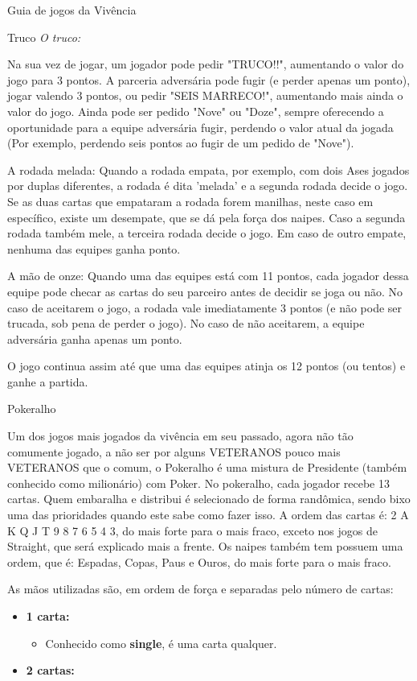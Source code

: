 \begin{secao}{Guia de jogos da Vivência }
\begin{subsecao}{Truco}
\textit{O truco:}

Na sua vez de jogar, um jogador pode pedir "TRUCO!!", aumentando o valor do jogo para 3 pontos. A parceria adversária pode fugir (e perder apenas um ponto), jogar valendo 3 pontos, ou pedir "SEIS MARRECO!", aumentando mais ainda o valor do jogo. Ainda pode ser pedido "Nove" ou "Doze", sempre oferecendo a oportunidade para a equipe adversária fugir, perdendo o valor atual da jogada (Por exemplo, perdendo seis pontos ao fugir de um pedido de "Nove"). 

A rodada melada: Quando a rodada empata, por exemplo, com dois Ases jogados por duplas diferentes, a rodada é dita 'melada' e a segunda rodada decide o jogo. Se as duas cartas que empataram a rodada forem manilhas, neste caso em específico, existe um desempate, que se dá pela força dos naipes.  Caso a segunda rodada também mele, a terceira rodada decide o jogo. Em caso de outro empate, nenhuma das equipes ganha ponto. 

A mão de onze: Quando uma das equipes está com 11 pontos, cada jogador dessa equipe pode checar as cartas do seu parceiro antes de decidir se joga ou não. No caso de aceitarem o jogo, a rodada vale imediatamente 3 pontos (e não pode ser trucada, sob pena de perder o jogo). No caso de não aceitarem, a equipe adversária ganha apenas um ponto. 

O jogo continua assim até que uma das equipes atinja os 12 pontos (ou tentos) e ganhe a partida. 

\end{subsecao}
\begin{subsecao}{Pokeralho}

Um dos jogos mais jogados da vivência em seu passado, agora não tão comumente jogado, a não ser por alguns VETERANOS pouco mais VETERANOS que o comum, o Pokeralho é uma mistura de Presidente (também conhecido como milionário) com Poker. 
No pokeralho, cada jogador recebe 13 cartas. Quem embaralha e distribui é selecionado de forma randômica, sendo bixo uma das prioridades quando este sabe como fazer isso. 
A ordem das cartas é: 2 A K Q J T 9 8 7 6 5 4 3, do mais forte para o mais fraco, exceto nos jogos de Straight, que será explicado mais a frente. 
Os naipes também tem possuem uma ordem, que é: Espadas, Copas, Paus e Ouros, do mais forte para o mais fraco. 

As mãos utilizadas são, em ordem de força e separadas pelo número de cartas:
\begin{itemize}


\item \textbf {1 carta:}
\begin{itemize}
\item Conhecido como \textbf{single}, é uma carta qualquer.
\end{itemize}
\item \textbf {2 cartas:}
\begin{itemize}


\end{itemize}
\end{itemize}
\end{subsecao}
\end{secao}
